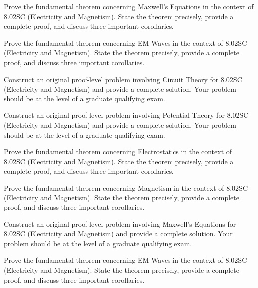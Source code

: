 \documentclass[12pt,a4paper]{exam}
\begin{document}
\begin{questions}
\vspace{0.3cm}

\question[3]
Prove the fundamental theorem concerning Maxwell's Equations in the context of 8.02SC (Electricity and Magnetism). State the theorem precisely, provide a complete proof, and discuss three important corollaries.

\vspace{0.3cm}

\question[5]
Prove the fundamental theorem concerning EM Waves in the context of 8.02SC (Electricity and Magnetism). State the theorem precisely, provide a complete proof, and discuss three important corollaries.

\vspace{0.3cm}

\question[4]
Construct an original proof-level problem involving Circuit Theory for 8.02SC (Electricity and Magnetism) and provide a complete solution. Your problem should be at the level of a graduate qualifying exam.

\vspace{0.3cm}

\question[6]
Construct an original proof-level problem involving Potential Theory for 8.02SC (Electricity and Magnetism) and provide a complete solution. Your problem should be at the level of a graduate qualifying exam.

\vspace{0.3cm}

\question[5]
Prove the fundamental theorem concerning Electrostatics in the context of 8.02SC (Electricity and Magnetism). State the theorem precisely, provide a complete proof, and discuss three important corollaries.

\vspace{0.3cm}

\question[4]
Prove the fundamental theorem concerning Magnetism in the context of 8.02SC (Electricity and Magnetism). State the theorem precisely, provide a complete proof, and discuss three important corollaries.

\vspace{0.3cm}

\question[4]
Construct an original proof-level problem involving Maxwell's Equations for 8.02SC (Electricity and Magnetism) and provide a complete solution. Your problem should be at the level of a graduate qualifying exam.

\vspace{0.3cm}

\question[6]
Prove the fundamental theorem concerning EM Waves in the context of 8.02SC (Electricity and Magnetism). State the theorem precisely, provide a complete proof, and discuss three important corollaries.


\end{questions}
\end{document}

